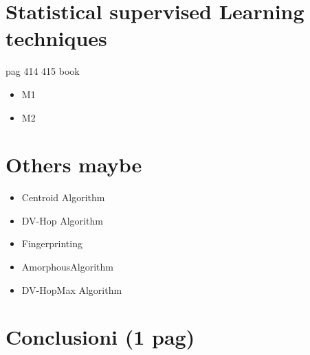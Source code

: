 \documentclass[12pt]{article}
\begin{document}
\section{Statistical supervised Learning techniques} 
pag 414 415 book	
\begin{itemize}
    \item M1
    \item M2
\end{itemize}
\clearpage

\section{Others maybe}
\begin{itemize}
    \item Centroid Algorithm
    \item DV-Hop Algorithm
    \item Fingerprinting
    \item AmorphousAlgorithm
    \item DV-HopMax Algorithm
\end{itemize}

\clearpage





\section{Conclusioni (1 pag)}









\clearpage
\printbibliography[
heading=bibintoc,
title={Whole bibliography}
]

\clearpage

\printbibliography[heading=subbibintoc,type=article,title={Articles only}]
\printbibliography[type=book,title={Books only}]
\printbibliography[keyword={physics},title={Physics-related only}]
\printbibliography[keyword={latex},title={\LaTeX-related only}]
\end{document}
